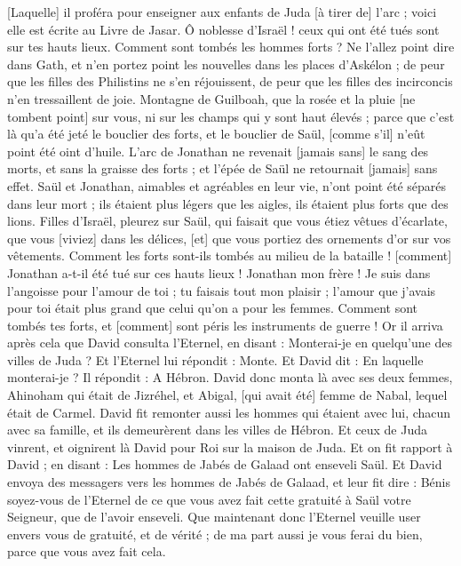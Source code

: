\begin{multicols}{2}
[Laquelle] il proféra pour enseigner aux enfants de Juda [à tirer de] l'arc ; voici elle est écrite au Livre de Jasar.
Ô noblesse d'Israël ! ceux qui ont été tués sont sur tes hauts lieux. Comment sont tombés les hommes forts ?
Ne l'allez point dire dans Gath, et n'en portez point les nouvelles dans les places d'Askélon ; de peur que les filles des Philistins ne s'en réjouissent, de peur que les filles des incirconcis n'en tressaillent de joie.
Montagne de Guilboah, que la rosée et la pluie [ne tombent point] sur vous, ni sur les champs qui y sont haut élevés ; parce que c'est là qu'a été jeté le bouclier des forts, et le bouclier de Saül, [comme s'il] n'eût point été oint d'huile.
L'arc de Jonathan ne revenait [jamais sans] le sang des morts, et sans la graisse des forts ; et l'épée de Saül ne retournait [jamais] sans effet.
Saül et Jonathan, aimables et agréables en leur vie, n'ont point été séparés dans leur mort ; ils étaient plus légers que les aigles, ils étaient plus forts que des lions.
Filles d'Israël, pleurez sur Saül, qui faisait que vous étiez vêtues d'écarlate, que vous [viviez] dans les délices, [et] que vous portiez des ornements d'or sur vos vêtements.
Comment les forts sont-ils tombés au milieu de la bataille ! [comment] Jonathan a-t-il été tué sur ces hauts lieux !
Jonathan mon frère ! Je suis dans l'angoisse pour l'amour de toi ; tu faisais tout mon plaisir ; l'amour que j'avais pour toi était plus grand que celui qu'on a pour les femmes.
Comment sont tombés tes forts, et [comment] sont péris les instruments de guerre !
\VerseOne{}Or il arriva après cela que David consulta l'Eternel, en disant : Monterai-je en quelqu'une des villes de Juda ? Et l'Eternel lui répondit : Monte. Et David dit : En laquelle monterai-je ? Il répondit : A Hébron.
David donc monta là avec ses deux femmes, Ahinoham qui était de Jizréhel, et Abigal, [qui avait été] femme de Nabal, lequel était de Carmel.
David fit remonter aussi les hommes qui étaient avec lui, chacun avec sa famille, et ils demeurèrent dans les villes de Hébron.
Et ceux de Juda vinrent, et oignirent là David pour Roi sur la maison de Juda. Et on fit rapport à David ; en disant : Les hommes de Jabés de Galaad ont enseveli Saül.
Et David envoya des messagers vers les hommes de Jabés de Galaad, et leur fit dire : Bénis soyez-vous de l'Eternel de ce que vous avez fait cette gratuité à Saül votre Seigneur, que de l'avoir enseveli.
Que maintenant donc l'Eternel veuille user envers vous de gratuité, et de vérité ; de ma part aussi je vous ferai du bien, parce que vous avez fait cela.

\end{multicols}
